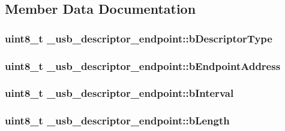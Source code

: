 \subsection{Member Data Documentation}
\hypertarget{struct__usb__descriptor__endpoint_a3bfe14127ca7aea1148d634f09ac38cf}{
\subsubsection[{b\-Descriptor\-Type}]{\setlength{\rightskip}{0pt plus 5cm}uint8\-\_\-t \-\_\-usb\-\_\-descriptor\-\_\-endpoint\-::b\-Descriptor\-Type}}\label{struct__usb__descriptor__endpoint_a3bfe14127ca7aea1148d634f09ac38cf}
\hypertarget{struct__usb__descriptor__endpoint_ae40644f7137b84d98de220ddbffed779}{
\subsubsection[{b\-Endpoint\-Address}]{\setlength{\rightskip}{0pt plus 5cm}uint8\-\_\-t \-\_\-usb\-\_\-descriptor\-\_\-endpoint\-::b\-Endpoint\-Address}}\label{struct__usb__descriptor__endpoint_ae40644f7137b84d98de220ddbffed779}
\hypertarget{struct__usb__descriptor__endpoint_a9b162ee9a2ae7222734ea3b9cc17cb71}{
\subsubsection[{b\-Interval}]{\setlength{\rightskip}{0pt plus 5cm}uint8\-\_\-t \-\_\-usb\-\_\-descriptor\-\_\-endpoint\-::b\-Interval}}\label{struct__usb__descriptor__endpoint_a9b162ee9a2ae7222734ea3b9cc17cb71}
\hypertarget{struct__usb__descriptor__endpoint_ab891639a51492967253ac77dafbbaa44}{
\subsubsection[{b\-Length}]{\setlength{\rightskip}{0pt plus 5cm}uint8\-\_\-t \-\_\-usb\-\_\-descriptor\-\_\-endpoint\-::b\-Length}}\label{struct__usb__descriptor__endpoint_ab891639a51492967253ac77dafbbaa44}
